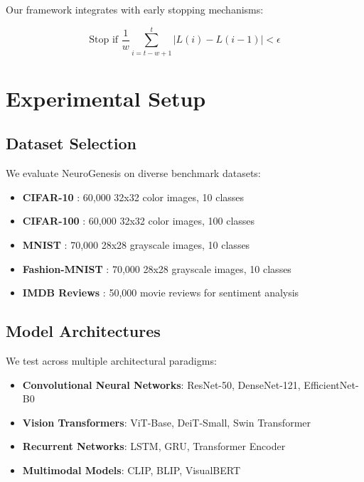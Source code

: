 \documentclass[12pt,a4paper]{article}
\begin{document}
Our framework integrates with early stopping mechanisms:

\begin{equation}
    \text{Stop if } \frac{1}{w} \sum_{i=t-w+1}^t |L(i) - L(i-1)| < \epsilon
\end{equation}

\section{Experimental Setup}
\label{sec:experiments}

\subsection{Dataset Selection}

We evaluate NeuroGenesis on diverse benchmark datasets:

\begin{itemize}
    \item \textbf{CIFAR-10} \cite{krizhevsky2009learning}: 60,000 32x32 color images, 10 classes
    \item \textbf{CIFAR-100} \cite{krizhevsky2009learning}: 60,000 32x32 color images, 100 classes
    \item \textbf{MNIST} \cite{lecun1998gradient}: 70,000 28x28 grayscale images, 10 classes
    \item \textbf{Fashion-MNIST} \cite{xiao2017fashion}: 70,000 28x28 grayscale images, 10 classes
    \item \textbf{IMDB Reviews} \cite{maas2011learning}: 50,000 movie reviews for sentiment analysis
\end{itemize}

\subsection{Model Architectures}

We test across multiple architectural paradigms:

\begin{itemize}
    \item \textbf{Convolutional Neural Networks}: ResNet-50, DenseNet-121, EfficientNet-B0
    \item \textbf{Vision Transformers}: ViT-Base, DeiT-Small, Swin Transformer
    \item \textbf{Recurrent Networks}: LSTM, GRU, Transformer Encoder
    \item \textbf{Multimodal Models}: CLIP, BLIP, VisualBERT
\end{itemize}
\end{document}
